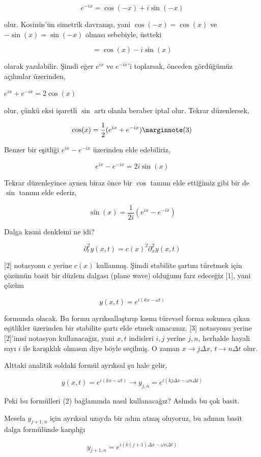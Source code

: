 \documentclass[12pt,fleqn]{article}\usepackage{../../common}
\begin{document}
$$
e^{-ix} = \cos (-x) + i\sin(-x)
$$

olur. Kosinüs'ün simetrik davranışı, yani $\cos(-x)=\cos(x)$ ve
$-\sin(x)=\sin(-x)$ olması sebebiyle, üstteki 

$$
= \cos(x) - i\sin(x)
$$

olarak yazılabilir. Şimdi eğer $e^{ix}$ ve $e^{-ix}$'i toplarsak, önceden
gördüğümüz açılımlar üzerinden,

$
e^{ix} + e^{-ix} = 2\cos(x)
$

olur, çünkü eksi işaretli $\sin$ artı olanla beraber iptal olur. Tekrar
düzenlersek,

$$
\cos(x) = \frac{1}{2} (e^{ix} + e^{-ix})
\mlabel{3}
$$

Benzer bir eşitliği $e^{ix} - e^{-ix}$ üzerinden elde edebiliriz,

$$
e^{ix} - e^{-ix} = 2i\sin(x)
$$

Tekrar düzenleyince aynen biraz önce bir $\cos$ tanımı elde ettiğimiz gibi
bir de $\sin$ tanımı elde ederiz,

$$
\sin(x) = \frac{1}{2i} (e^{ix} - e^{-ix})
$$

Dalga kısmi denklemi ne idi?

$$
\partial_t^2 y(x,t) = c(x)^2 \partial_x^2 y(x,t)
$$

[2] notasyonu $c$ yerine $c(x)$ kullanmış. Şimdi stabilite şartını türetmek için
çözümün basit bir düzlem dalgası (plane wave) olduğunu farz edeceğiz [1], yani
çözüm

$$
y(x,t) = e^{i(kx-\omega t)}
$$

formunda olacak. Bu formu ayrıksallaştırıp kısmı türevsel forma sokunca çıkan
eşitlikler üzerinden bir stabilite şartı elde etmek amacımız. [3] notasyonu
yerine [2]'imsi notasyon kullanacağız, yani $x,t$ indisleri $i,j$ yerine $j,n$,
herhalde hayali sayı $i$ ile karışıklık olmasın diye böyle seçilmiş. O zaman $x
\to j \Delta x$, $t \to n \Delta t$ olur.

Alttaki analitik soldaki formül ayrıksal şu hale gelir,

$$
y(x,t) = e^{i(kx - \omega t)} \to
y_{j,n} = e^{i(kj\Delta x - \omega n \Delta t)}
$$

Peki bu formülleri (2) bağlamında nasıl kullanacağız? Aslında bu çok basit.

Mesela $y_{j+1,n}$ için ayrıksal uzayda bir adım atmış oluyoruz, bu adımın
basit dalga formülünde karşılığı

$$
y_{j+1,n} = e^{i ( k(j+1)\Delta x - \omega n \Delta t )}
$$
\end{document}
